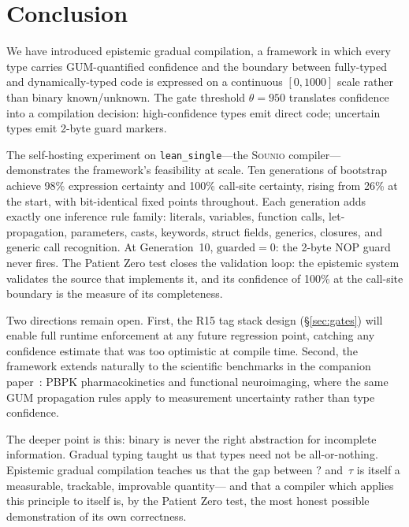 \documentclass[acmsmall,screen,review,anonymous]{acmart}
\newcommand{\sounio}{\textsc{Sounio}\xspace}
\newcommand{\lean}{\texttt{lean\_single}\xspace}
\begin{document}
\section{Conclusion}
\label{sec:conclusion}

We have introduced epistemic gradual compilation, a framework in which
every type carries GUM-quantified confidence and the boundary between
fully-typed and dynamically-typed code is expressed on a continuous
$[0, 1000]$ scale rather than binary known/unknown.
The gate threshold $\theta = 950$ translates confidence into a
compilation decision: high-confidence types emit direct code;
uncertain types emit 2-byte guard markers.

The self-hosting experiment on \lean---the \sounio compiler---demonstrates
the framework's feasibility at scale.
Ten generations of bootstrap achieve 98\% expression certainty and
100\% call-site certainty, rising from 26\% at the start, with
bit-identical fixed points throughout.
Each generation adds exactly one inference rule family:
literals, variables, function calls, let-propagation, parameters,
casts, keywords, struct fields, generics, closures, and generic
call recognition.
At Generation~10, $\text{guarded} = 0$: the 2-byte NOP guard never fires.
The Patient Zero test closes the validation loop: the epistemic system
validates the source that implements it, and its confidence of 100\%
at the call-site boundary is the measure of its completeness.

Two directions remain open.
First, the R15 tag stack design (\S\ref{sec:gates}) will enable full
runtime enforcement at any future regression point, catching any
confidence estimate that was too optimistic at compile time.
Second, the framework extends naturally to the scientific benchmarks
in the companion paper~\cite{sounio2026}: PBPK pharmacokinetics and
functional neuroimaging, where the same GUM propagation rules apply
to measurement uncertainty rather than type confidence.

The deeper point is this: binary is never the right abstraction for
incomplete information.
Gradual typing taught us that types need not be all-or-nothing.
Epistemic gradual compilation teaches us that the gap between $?$
and~$\tau$ is itself a measurable, trackable, improvable quantity---
and that a compiler which applies this principle to itself is, by
the Patient Zero test, the most honest possible demonstration of its
own correctness.
\end{document}
